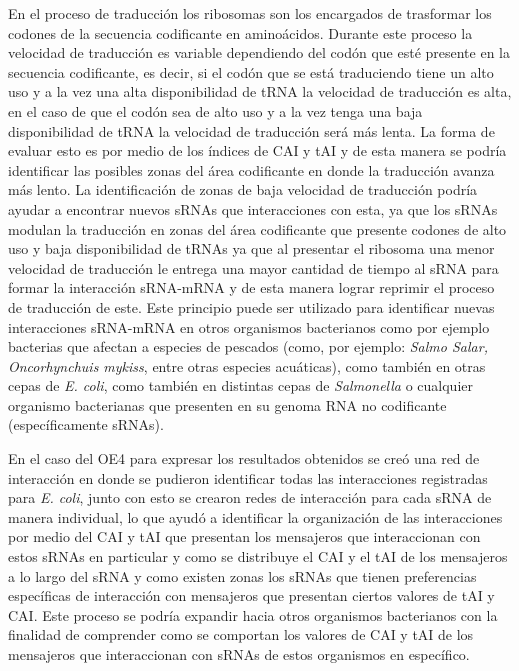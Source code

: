 En el proceso de traducci\'on los ribosomas son los encargados de trasformar los codones de la secuencia codificante en amino\'acidos. Durante este proceso la velocidad de traducci\'on es variable dependiendo del cod\'on que est\'e presente en la secuencia codificante, es decir, si el cod\'on que se está traduciendo tiene un alto uso y a la vez una alta disponibilidad de tRNA la velocidad de traducci\'on es alta, en el caso de que el cod\'on sea de alto uso y a la vez tenga una baja disponibilidad de tRNA la velocidad de traducci\'on ser\'a m\'as lenta. La forma de evaluar esto es por medio de los \'indices de CAI y tAI y de esta manera se podr\'ia identificar las posibles zonas del \'area codificante en donde la traducci\'on avanza m\'as lento. La identificaci\'on de zonas de baja velocidad de traducci\'on podr\'ia ayudar a encontrar nuevos sRNAs que interacciones con esta, ya que los sRNAs modulan la traducci\'on en zonas del \'area codificante que presente codones de alto uso y baja disponibilidad de tRNAs ya que al presentar el ribosoma una menor velocidad de traducci\'on le entrega una mayor cantidad de tiempo al sRNA para formar la interacci\'on sRNA-mRNA y de esta manera lograr reprimir el proceso de traducci\'on de este. Este principio puede ser utilizado para identificar nuevas interacciones sRNA-mRNA en otros organismos bacterianos como por ejemplo bacterias que afectan a especies de pescados (como, por ejemplo: \textit{Salmo Salar, Oncorhynchuis mykiss}, entre otras especies acu\'aticas), como tambi\'en en otras cepas de \textit{E. coli}, como tambi\'en en distintas cepas de \textit{Salmonella} o cualquier organismo bacterianas que presenten en su genoma RNA no codificante (espec\'ificamente sRNAs).

En el caso del OE4 para expresar los resultados obtenidos se cre\'o una red de interacci\'on en donde se pudieron identificar todas las interacciones registradas para \textit{E. coli}, junto con esto se crearon redes de interacci\'on para cada sRNA de manera individual, lo que ayud\'o a identificar la organizaci\'on de las interacciones por medio del CAI y tAI que presentan los mensajeros que interaccionan con estos sRNAs en particular y como se distribuye el CAI y el tAI de los mensajeros a lo largo del sRNA y como existen zonas los sRNAs que tienen preferencias espec\'ificas de interacci\'on con mensajeros que presentan ciertos valores de tAI y CAI. Este proceso se podr\'ia expandir hacia otros organismos bacterianos con la finalidad de comprender como se comportan los valores de CAI y tAI de los mensajeros que interaccionan con sRNAs de estos organismos en espec\'ifico.


